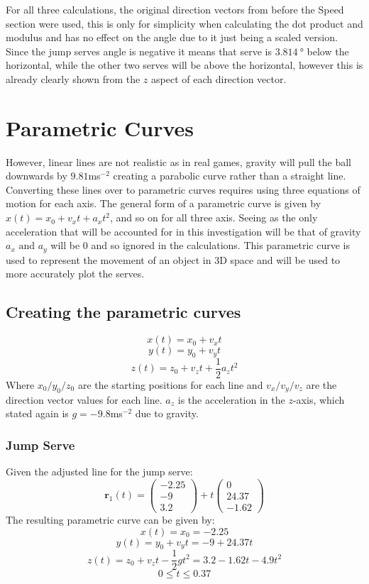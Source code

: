 \documentclass{article}
\begin{document}
												For all three calculations, the original direction vectors from before the Speed section were used, this is only for simplicity when calculating the dot product and modulus and has no effect on the angle due to it just being a scaled version. Since the jump serves angle is negative it means that serve is \(\SI{3.814}{\degree}\) below the horizontal, while the other two serves will be above the horizontal, however this is already clearly shown from the \(z\) aspect of each direction vector.



												\section*{Parametric Curves}
												However, linear lines are not realistic as in real games, gravity will pull the ball downwards by \(9.81\)ms\(^{-2}\) creating a parabolic curve rather than a straight line. Converting these lines over to parametric curves requires using three equations of motion for each axis. The general form of a parametric curve is given by \(x(t) = x_{0}+v_{x}t+a_{x}t^{2}\), and so on for all three axis. Seeing as the only acceleration that will be accounted for in this investigation will be that of gravity \(a_{x} \text{ and } a_{y}\) will be \(0\) and so ignored in the calculations. This parametric curve is used to represent the movement of an object in 3D space and will be used to more accurately plot the serves.

												\subsection*{Creating the parametric curves}

												\[x(t) = x_{0} + v_{x}t\]
												\[y(t) = y_{0} + v_{y}t\]
												\[z(t) = z_{0} + v_{z}t + \frac{1}{2}a_{z}t^{2}\]
												Where \(x_{0}/y_{0}/z_{0}\) are the starting positions for each line and \(v_{x}/v_{y}/v_{z}\) are the direction vector values for each line. \(a_{z}\) is the acceleration in the \(z\)-axis, which stated again is \(g = -9.8\)ms\(^{-2}\) due to gravity. 
												\subsubsection*{Jump Serve}
												Given the adjusted line for the jump serve: 
												\[\mathbf{r}_1(t) = 
													\begin{pmatrix} -2.25 \\ -9 \\ 3.2 \end{pmatrix} 
													+ t \begin{pmatrix} 0 \\ 24.37 \\ -1.62 \end{pmatrix}\] 
													The resulting parametric curve can be given by:
													\[ x(t) = x_{0} = -2.25 \]
													\[ y(t) = y_{0} + v_{y}t = -9 + 24.37t \]
													\[ z(t) = z_{0} + v_{z}t - \frac{1}{2}gt^{2} = 3.2 - 1.62t -4.9t^{2} \]
													\[0 \le t \le 0.37\]
\end{document}
